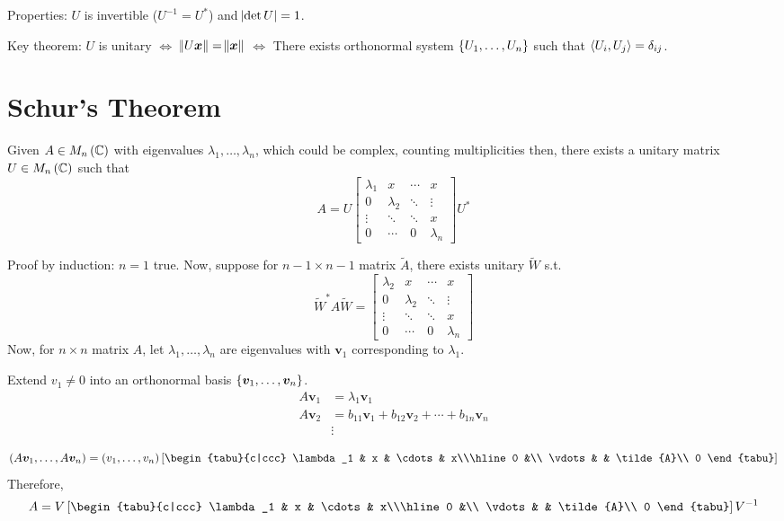 \documentclass{article}
\DeclarePairedDelimiter\ip{\langle }{\rangle}
\newcommand{\m}[1]{\begin{bmatrix} #1 \end{bmatrix}}
\newcommand{\CC}{\mathbb{C}}
\begin{document}
Properties: \(U\) is invertible (\(U^{-1} = U^*\)) and \(\abs{\det U} = 1\).

Key theorem: \(U\) is unitary \(\Longleftrightarrow\) \(\norm{U\bm x} = \norm{\bm x}\) \(\Longleftrightarrow\) There exists orthonormal system \(\set{U_1, \dots, U_n}\) such that \(\ip{U_i, U_j} = \delta_{ij}\).

\section{Schur's Theorem}
Given \(A \in M_n\del{\CC}\) with eigenvalues \(\lambda_1, \dots, \lambda_n\), which could be complex, counting multiplicities then, there exists a unitary matrix \(U \in M_n\del{\CC}\) such that
\[A = U \m{\lambda_1 & x & \cdots & x\\0&\lambda_2 & \ddots & \vdots \\ \vdots&\ddots& \ddots  & x\\ 0&\cdots&0&\lambda_n } U^*\]

Proof by induction: \(n = 1\) true.
Now, suppose for \(n-1 \times n-1\) matrix \(\tilde{A}\), there exists unitary \(\tilde{W}\)  s.t.
\[\tilde{W}^*A\tilde{W} = \m{\lambda_2 & x & \cdots & x\\0&\lambda_2 & \ddots & \vdots \\ \vdots&\ddots& \ddots  & x\\ 0&\cdots&0&\lambda_n } \]
Now, for \(n \times n\) matrix \(A\), let \(\lambda_1, \dots , \lambda_n\) are eigenvalues with \(\bm v_1\) corresponding to \(\lambda_1\).

Extend \(v_1 \neq 0\) into an orthonormal basis \(\set{\bm v_1, \dots, \bm v_n}\).
\begin{align*}
  A \bm v_1 &= \lambda_1 \bm v_1\\
  A \bm v_2 &= b_{11} \bm v_1 + b_{12}\bm v_2 + \cdots + b_{1n} \bm v_n\\
  & \vdots
\end{align*}

\[\del{A \bm v_1 , \dots, A \bm v_n} = (v_1, \dots, v_n)
  \left[  \begin{tabu}{c|ccc}
        \lambda_1 & x & \cdots & x\\\hline
        0 &\\
        \vdots & & \tilde{A}\\
        0
  \end{tabu}\right]
\]
Therefore,
\[A = V\left[  \begin{tabu}{c|ccc}
        \lambda_1 & x & \cdots & x\\\hline
        0 &\\
        \vdots & & \tilde{A}\\
        0
  \end{tabu}\right]V^{-1}\]
\end{document}
